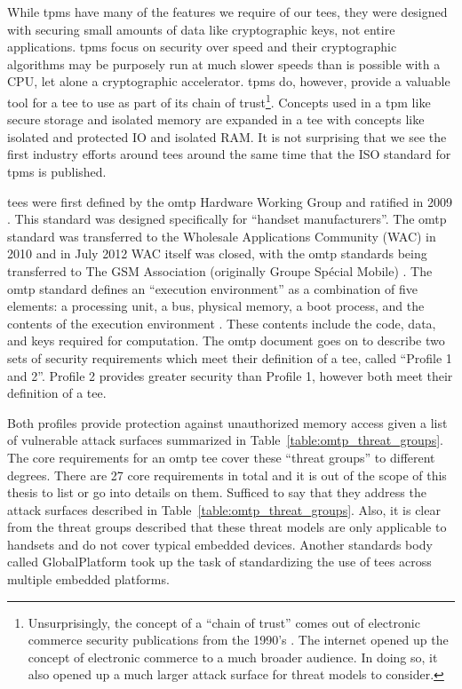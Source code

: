 While \glspl{tpm} have many of the features we require of our \glspl{tee}, they were designed with securing small amounts of data like cryptographic keys, not entire applications. \glspl{tpm} focus on security over speed and their cryptographic algorithms may be purposely run at much slower speeds than is possible with a CPU, let alone a cryptographic accelerator. \glspl{tpm} do, however, provide a valuable tool for a \gls{tee} to use as part of its \gls{chain of trust}\footnote{Unsurprisingly, the concept of a ``chain of trust'' comes out of electronic commerce security publications from the 1990's \cite{679731}. The internet opened up the concept of electronic commerce to a much broader audience. In doing so, it also opened up a much larger attack surface for threat models to consider.}. Concepts used in a \gls{tpm} like secure storage and isolated memory are expanded in a \gls{tee} with concepts like isolated and protected IO and isolated RAM. It is not surprising that we see the first industry efforts around \glspl{tee} around the same time that the ISO standard for \glspl{tpm} is published.

\glspl{tee} were first defined by the \gls{omtp} Hardware Working Group and ratified in 2009 \cite{Confidential2009}. This standard was designed specifically for ``handset manufacturers''. The \gls{omtp} standard was transferred to the Wholesale Applications Community (WAC) in 2010 and in July 2012 WAC itself was closed, with the \gls{omtp} standards being transferred to The GSM Association (originally Groupe Sp\'ecial Mobile) \cite{WAC}. The \gls{omtp} standard defines an ``execution environment'' as a combination of five elements: a processing unit, a bus, physical memory, a boot process, and the contents of the execution environment \cite{Confidential2009}. These contents include the code, data, and keys required for computation. The \gls{omtp} document goes on to describe two sets of security requirements which meet their definition of a \gls{tee}, called ``Profile 1 and 2''. Profile 2 provides greater security than Profile 1, however both meet their definition of a \gls{tee}.

\renewcommand{\arraystretch}{2}


Both profiles provide protection against unauthorized memory access given a list of vulnerable attack surfaces summarized in Table~\ref{table:omtp_threat_groups}. The core requirements for an \gls{omtp} \gls{tee} cover these ``threat groups'' to different degrees. There are 27 core requirements in total and it is out of the scope of this thesis to list or go into details on them. Sufficed to say that they address the attack surfaces described in Table~\ref{table:omtp_threat_groups}. Also, it is clear from the threat groups described that these threat models are only applicable to handsets and do not cover typical embedded devices. Another standards body called GlobalPlatform took up the task of standardizing the use of \glspl{tee} across multiple embedded platforms.

